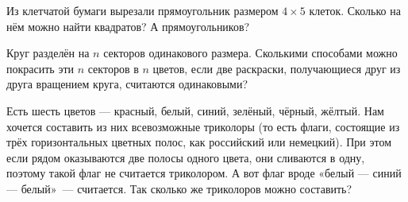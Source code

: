 ﻿
\begin{enumerate}
\itA Из клетчатой бумаги вырезали прямоугольник размером $4 \times 5$ клеток. Сколько на нём можно найти квадратов? А прямоугольников?

\itB Круг разделён на $n$ секторов одинакового размера. Сколькими способами можно покрасить эти $n$ секторов в $n$ цветов, если две раскраски, получающиеся друг из друга вращением круга, считаются одинаковыми?

\itC Есть шесть цветов — красный, белый, синий, зелёный, чёрный, жёлтый. Нам хочется составить из них всевозможные триколоры (то есть флаги, состоящие из трёх горизонтальных цветных полос, как российский или немецкий). При этом если рядом оказываются две полосы одного цвета, они сливаются в одну, поэтому такой флаг не считается триколором. А вот флаг вроде «белый — синий — белый»~— считается. Так сколько же триколоров можно составить?
\end{enumerate}